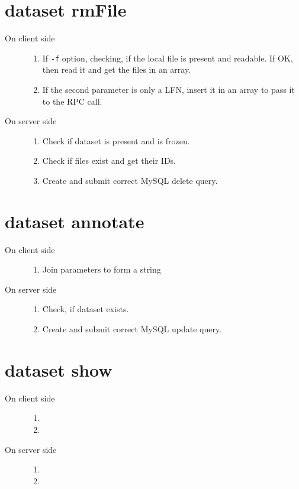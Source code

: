 \documentclass{scrreprt}
\begin{document}
\section{dataset rmFile}
\begin{description}
%
\item[On client side] \hfill 
\begin{enumerate}
\item If \texttt{-f} option, checking, if the local file is present and readable. If OK, then read it and get the files in an array.
\item If the second parameter is only a LFN, insert it in an array to pass it to the RPC call.
\end{enumerate}
%
\item[On server side] \hfill
\begin{enumerate}
\item Check if dataset is present and is frozen.
\item Check if files exist and get their IDs.
\item Create and submit correct MySQL delete query.
\end{enumerate}

\end{description}


\section{dataset annotate} 
\begin{description}
%
\item[On client side] \hfill
\begin{enumerate}
\item Join parameters to form a string
\end{enumerate}
%
\item[On server side] \hfill
\begin{enumerate}
\item Check, if dataset exists.
\item Create and submit correct MySQL update query.
\end{enumerate}
\end{description}


\section{dataset show}  
\begin{description}
%
\item[On client side] \hfill
\begin{enumerate} 
\item 
\item

\end{enumerate}
%
\item[On server side] \hfill
\begin{enumerate} 
\item 
\item

\end{enumerate}

\end{description}
\end{document}
